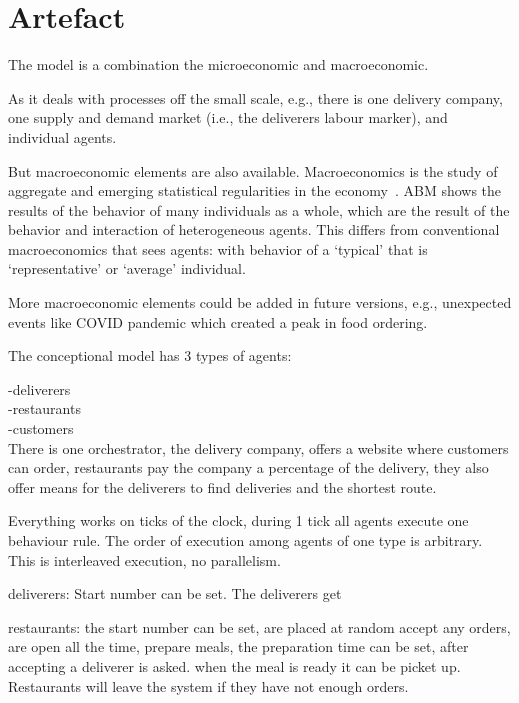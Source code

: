 \section{Artefact}

The model is a combination the microeconomic and macroeconomic.

As it deals with processes off the small scale, e.g., there is one delivery company, one supply and demand market (i.e., the deliverers labour marker), and
individual agents.

But macroeconomic elements are also available.
Macroeconomics is the study of aggregate and emerging statistical regularities in the economy~\cite{cincotti2022we}.
ABM shows the results of the behavior of many individuals as a whole, which are the result of the behavior and interaction of heterogeneous agents.
This differs from conventional macroeconomics that sees agents: with behavior of a `typical' that is `representative' or `average' individual.

More macroeconomic elements could be added in future versions, e.g., unexpected events like COVID pandemic which created a peak in food ordering.


The conceptional model has 3 types of agents:

-deliverers \\
-restaurants \\
-customers \\

There is one orchestrator, the delivery company, offers a website where customers can order,
restaurants pay the company a percentage of the delivery, they also offer means for the deliverers to
find deliveries and the shortest route.

Everything works on ticks of the clock, during 1 tick all agents execute one behaviour rule.
The order of execution among agents of one type is arbitrary.
This is interleaved execution, no parallelism.


deliverers:
Start number can be set.
The deliverers get


restaurants:
the start number can be set, are placed at random
accept any orders, are open all the time,
prepare meals, the preparation time can be set,
after accepting a deliverer is asked.
when the meal is ready it can be picket up.
Restaurants will leave the system if they have not enough orders.

